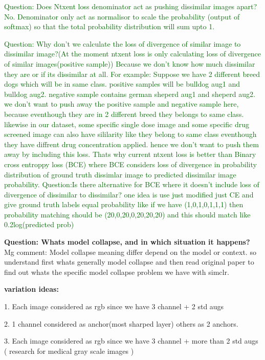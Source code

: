 \documentclass[12pt,twoside,a4paper,parskip]{scrbook} %
\begin{document}
\textcolor{darkgreen}{Question: Does Ntxent loss denominator act as pushing dissimilar images apart?}
\textcolor{darkgreen}{No. Denominator only act as normalisor to scale the probability (output of softmax) so that the total probability distribution will sum upto 1.} 

\textcolor{darkgreen}{Question: Why don’t we calculate the loss of divergence of similar image to dissimilar image?(At the moment ntxent loss is only calculating loss of divergence of similar images(positive sample))}
\textcolor{darkgreen}{Because we don’t know how much dissimilar they are or if its dissimilar at all. For example: Suppose we have 2 different breed dogs which will be in same class. positive samples will be bulldog aug1 and bulldog aug2. negative sample contains german sheperd aug1 and sheperd aug2. we don't want to push away the positive sample and negative sample here, because eventhough they are in 2 different breed they belongs to same class. likewise in our dataset, some specific single dose image and some specific drug screened image can also have sililarity like they belong to same class eventhough they have diffrent drug concentration applied. hence we don't want to push them away by including this loss.
Thats why current ntxent loss is better than Binary cross entroppy loss (BCE) where BCE considers loss of divergence in probability distribution of ground truth dissimlar image to predicted dissimilar image probability.}
\textcolor{darkgreen}{Question:Is there alternative for BCE where it doesn't include loss of divergence of dissimilar to dissimilar? one idea is use just modified just CE and give ground truth labels equal probability like if we have (1,0,1,0,1,1,1) then probability matching should be (20,0,20,0,20,20,20) and this should match like 0.2log(predicted prob)}

\textbf{Question: Whats model collapse, and in which situation it happens?}
Mg comment: Model collapse meaning differ depend on the model or context. so understand first whats generally model collapse and then read original paper to find out whats the specific model collapse problem we have with simclr.

\textbf{variation ideas:}

1. Each image considered as rgb since we have 3 channel + 2 std augs

2. 1 channel considered as anchor(most sharped layer) others as 2 anchors.

3. Each image considered as rgb since we have 3 channel + more than 2 std augs ( research for medical gray scale images )
\end{document}
